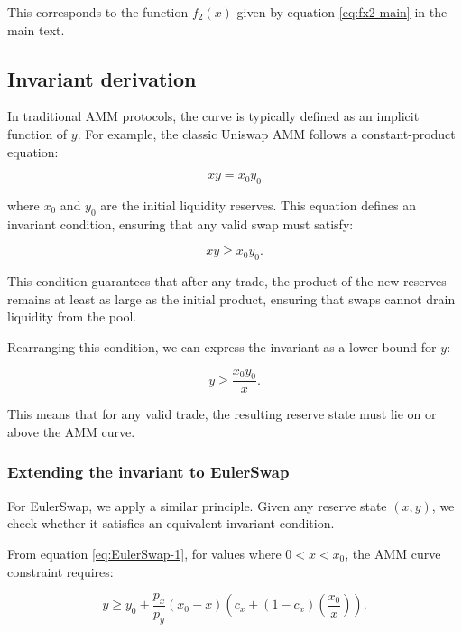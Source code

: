 \documentclass{article}
\begin{document}
This corresponds to the function \( f_2(x) \) given by equation \eqref{eq:fx2-main} in the main text.

\subsection{Invariant derivation}
\label{sec:invariant-derivation}

In traditional AMM protocols, the curve is typically defined as an implicit function of $y$. For example, the classic Uniswap AMM follows a constant-product equation:

\begin{equation}
    xy = x_0 y_0
\end{equation}

where $x_0$ and $y_0$ are the initial liquidity reserves. This equation defines an invariant condition, ensuring that any valid swap must satisfy:

\begin{equation}
    xy \geq x_0 y_0.
\end{equation}

This condition guarantees that after any trade, the product of the new reserves remains at least as large as the initial product, ensuring that swaps cannot drain liquidity from the pool.

Rearranging this condition, we can express the invariant as a lower bound for $y$:

\begin{equation}
    y \geq \frac{x_0 y_0}{x}.
\end{equation}

This means that for any valid trade, the resulting reserve state must lie on or above the AMM curve.  

\subsubsection{Extending the invariant to EulerSwap}

For EulerSwap, we apply a similar principle. Given any reserve state $(x, y)$, we check whether it satisfies an equivalent invariant condition.

From equation \eqref{eq:EulerSwap-1}, for values where \( 0 < x < x_0 \), the AMM curve constraint requires:

\begin{equation}
    \label{eq:invariant-x1}
    y \geq y_{0}+\frac{p_{x}}{p_{y}}\left(x_{0}-x\right)\left(c_{x}+\left(1-c_{x}\right)\left(\frac{x_{0}}{x}\right)\right).
\end{equation}
\end{document}
